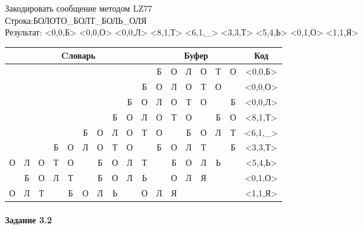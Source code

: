 \documentclass[a4paper, 12pt]{article}
\begin{document}
Закодировать сообщение методом LZ77\\
Строка:БОЛОТО\_БОЛТ\_БОЛЬ\_ОЛЯ\\
Результат: <0,0,Б> <0,0,О> <0,0,Л> <8,1,Т> <6,1,\_> <3,3,Т> <5,4,Ь> <0,1,О> <1,1,Я>\\
\begin{table}[h!]
\centering
\begin{tabular}{|c|c|c|c|c|c|c|c|c|c|c|c|c|c|c|c|c|} 
\hline
\multicolumn{10}{|c|}{Cловарь} & \multicolumn{6}{c|}{Буфер} & Код  \\ \hline
  &   &   &   &   &   &   &   &   &   & \cellcolor[HTML]{8CE4F6} Б & О & Л & О & Т & О & <0,0,Б>
\\ \hline
  &   &   &   &   &   &   &   &   & Б & \cellcolor[HTML]{8CE4F6} О & Л & О & Т & О &   & <0,0,О>
\\ \hline
  &   &   &   &   &   &   &   & Б & О & \cellcolor[HTML]{8CE4F6} Л & О & Т & О &   & Б & <0,0,Л>
\\ \hline
  &   &   &   &   &   &   & Б & \cellcolor[HTML]{FFFF00} О & Л & \cellcolor[HTML]{FFFF00} О & \cellcolor[HTML]{8CE4F6} Т & О &   & Б & О & <8,1,Т>
\\ \hline
  &   &   &   &   & Б & \cellcolor[HTML]{FFFF00} О & Л & О & Т & \cellcolor[HTML]{FFFF00} О & \cellcolor[HTML]{8CE4F6}   & Б & О & Л & Т & <6,1,\_>
\\ \hline
  &   &   & \cellcolor[HTML]{FFFF00} Б & \cellcolor[HTML]{FFFF00} О & \cellcolor[HTML]{FFFF00} Л & О & Т & О &   & \cellcolor[HTML]{FFFF00} Б & \cellcolor[HTML]{FFFF00} О & \cellcolor[HTML]{FFFF00} Л & \cellcolor[HTML]{8CE4F6} Т &   & Б & <3,3,Т>
\\ \hline
О & Л & О & Т & О & \cellcolor[HTML]{FFFF00}   & \cellcolor[HTML]{FFFF00} Б & \cellcolor[HTML]{FFFF00} О & \cellcolor[HTML]{FFFF00} Л & Т & \cellcolor[HTML]{FFFF00}   & \cellcolor[HTML]{FFFF00} Б & \cellcolor[HTML]{FFFF00} О & \cellcolor[HTML]{FFFF00} Л & \cellcolor[HTML]{8CE4F6} Ь &   & <5,4,Ь>
\\ \hline
\cellcolor[HTML]{FFFF00}   & Б & О & Л & Т &   & Б & О & Л & Ь & \cellcolor[HTML]{FFFF00}   & \cellcolor[HTML]{8CE4F6} О & Л & Я &   &   & <0,1,О>
\\ \hline
О & \cellcolor[HTML]{FFFF00} Л & Т &   & Б & О & Л & Ь &   & О & \cellcolor[HTML]{FFFF00} Л & \cellcolor[HTML]{8CE4F6} Я &   &   &   &   & <1,1,Я>
\\ \hline
\end{tabular}
\end{table}

\paragraph{Задание 3.2}
\end{document}
